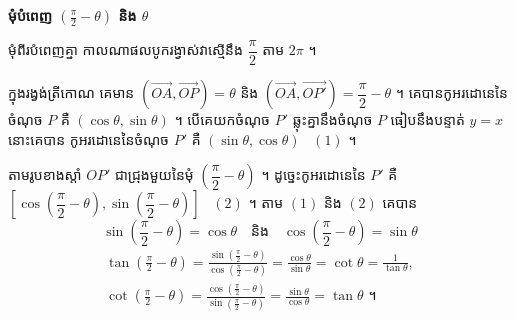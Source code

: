 \textbf{មុំបំពេញ $\left(\frac{\pi}{2} - \theta\right)$ និង $\theta$}

មុំពីរបំពេញគ្នា កាលណាផលបូករង្វាស់វាស្មើនឹង $\dfrac{\pi}{2}$ តាម $2\pi$ ។

ក្នុងរង្វង់ត្រីកោណ គេមាន $(\overrightarrow{OA}, \overrightarrow{OP}) = \theta$ និង $(\overrightarrow{OA}, \overrightarrow{OP'}) = \dfrac{\pi}{2} - \theta$ ។ គេបានកូអរដោនេនៃចំណុច $P$ គឺ $(\cos\theta, \sin\theta)$ ។ បើគេយកចំណុច $P'$ ឆ្លុះគ្នានឹងចំណុច $P$ ធៀបនឹងបន្ទាត់ $y = x$ នោះគេបាន កូអរដោនេនៃចំណុច $P'$ គឺ $(\sin\theta, \cos\theta)$ \ $(1)$ ។
\begin{center}
\end{center}
តាមរូបខាងស្តាំ $OP'$ ជាជ្រុងមួយនៃមុំ $\left(\dfrac{\pi}{2} - \theta\right)$ ។ ដូច្នេះកូអរដោនេនៃ $P'$ គឺ $\left[\cos\left(\dfrac{\pi}{2} - \theta\right), \sin\left(\dfrac{\pi}{2} - \theta\right)\right]$ \ $(2)$ ។
តាម $(1)$ និង $(2)$ គេបាន
\[ \sin\left(\frac{\pi}{2} - \theta\right) = \cos\theta \quad \text{និង} \quad \cos\left(\frac{\pi}{2} - \theta\right) = \sin\theta \]
\[
\begin{gathered}
\tan\left(\frac{\pi}{2} - \theta\right) = \frac{\sin\left(\frac{\pi}{2} - \theta\right)}{\cos\left(\frac{\pi}{2} - \theta\right)} = \frac{\cos\theta}{\sin\theta} = \cot\theta = \frac{1}{\tan\theta},\\
\cot\left(\frac{\pi}{2} - \theta\right) = \frac{\cos\left(\frac{\pi}{2} - \theta\right)}{\sin\left(\frac{\pi}{2} - \theta\right)} = \frac{\sin\theta}{\cos\theta} = \tan\theta \text{ ។}
\end{gathered}
\]
